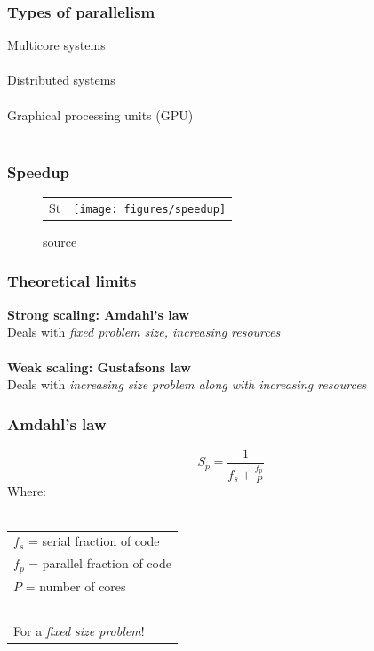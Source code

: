 \documentclass{beamer}
\begin{document}
\begin{frame}
	\frametitle{Types of parallelism}
	\begin{center}
		Multicore systems \\~\\
		
		Distributed systems \\~\\
		
		Graphical processing units (GPU) \\~\\
	\end{center}
\end{frame}

\begin{frame}
	\frametitle{Speedup}
	\begin{figure}[t]
		\begin{center}
			\begin{tabular}{ c c }
				St & \texttt{[image: figures/speedup]}	\\
			\end{tabular}
		\end{center}
		\caption{\href{https://portal.tacc.utexas.edu/c/document_library/get_file?uuid=e05d457a-0fbf-424b-87ce-c96fc0077099&groupId=13601}{source}}
	\end{figure}
\end{frame}

\begin{frame}
	\frametitle{Theoretical limits}
	\begin{center}
		\textbf{Strong scaling: Amdahl's law} \\
		Deals with \emph{fixed problem size, increasing resources}\\~\\
		
		\textbf{Weak scaling: Gustafsons law} \\
		Deals with \emph{increasing size problem along with increasing 
			resources}
	\end{center}
\end{frame}

\begin{frame}
	\frametitle{Amdahl's law}
	\begin{center}
		\begin{equation*}
			S_p = \frac{1}{f_s + \frac{f_p}{P}}
		\end{equation*}
		Where: \\~\\
		\begin{tabular}{ l }
		$f_s$ = serial fraction of code \\
		$f_p$ = parallel fraction of code \\
		$P$ = number of cores \\~\\
		For a \textit{fixed size problem}!
		\end{tabular}
	\end{center}
\end{frame}
\end{document}
